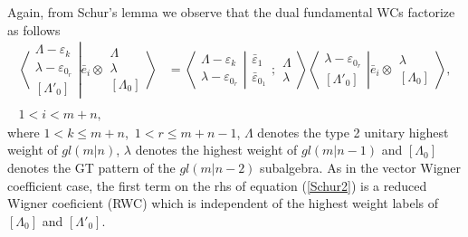 \documentclass[12pt]{article}
\def\nn{\nonumber}
\begin{document}
Again, from Schur's lemma we observe that the dual fundamental WCs factorize as follows
\begin{align}
\left\langle\left. 
\begin{array}{c} \Lambda-\varepsilon_k\\ \lambda-\varepsilon_{0_r} \\ {[\Lambda'_0]} \end{array}
\right|\right.
\left.
\bar{e}_i\otimes \begin{array}{c} \Lambda \\ \lambda \\
{[\Lambda_0]} \end{array}
\right\rangle &= 
\left\langle\left. 
\begin{array}{c} \Lambda-\varepsilon_k\\ \lambda-\varepsilon_{0_r} 
 \end{array}
\right|\right.
\left.
\begin{array}{c} \bar{\varepsilon}_1 \\ \bar{\varepsilon}_{0_1} 
 \end{array}
; \begin{array}{c} \Lambda \\ \lambda
 \end{array}
\right\rangle 
\left\langle\left. 
\begin{array}{c} \lambda-\varepsilon_{0_r} \\ {[\Lambda'_0]} \end{array}
\right|\right.
\left.
\bar{e}_i\otimes \begin{array}{c} \lambda \\
{[\Lambda_0]} \end{array}
\right\rangle,\label{Schur2}\\
~~\nn\\
1 < i < m+n, \nn
\end{align}
where $1 < k \leq m+n$,~$1 < r \leq m+n-1$, 
$\Lambda$ denotes the type 2 unitary highest weight of $gl(m|n)$, $\lambda$ denotes the highest weight of $gl(m|n-1)$ and $[\Lambda_0]$ denotes the GT pattern of the $gl(m|n-2)$ subalgebra. As in the vector Wigner coefficient case, the first term on the rhs of equation (\ref{Schur2}) is a reduced Wigner coeficient (RWC) which is independent of the highest
weight labels of $[\Lambda_0]$ and $[\Lambda'_0]$.
\end{document}

